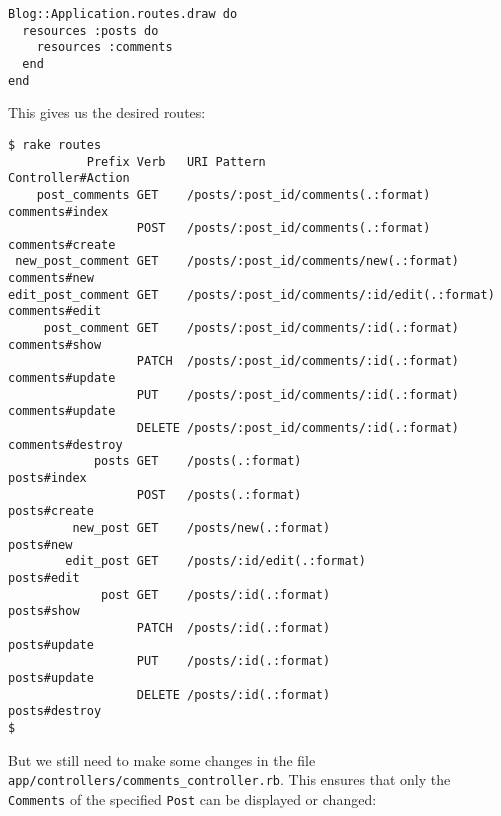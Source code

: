 \documentclass[a4paper]{book}
\begin{document}
\begin{shaded}\begin{verbatim}
Blog::Application.routes.draw do
  resources :posts do
    resources :comments
  end
end
\end{verbatim}\end{shaded}

This gives us the desired routes:

\begin{shaded}\begin{verbatim}
$ rake routes
           Prefix Verb   URI Pattern                                 Controller#Action
    post_comments GET    /posts/:post_id/comments(.:format)          comments#index
                  POST   /posts/:post_id/comments(.:format)          comments#create
 new_post_comment GET    /posts/:post_id/comments/new(.:format)      comments#new
edit_post_comment GET    /posts/:post_id/comments/:id/edit(.:format) comments#edit
     post_comment GET    /posts/:post_id/comments/:id(.:format)      comments#show
                  PATCH  /posts/:post_id/comments/:id(.:format)      comments#update
                  PUT    /posts/:post_id/comments/:id(.:format)      comments#update
                  DELETE /posts/:post_id/comments/:id(.:format)      comments#destroy
            posts GET    /posts(.:format)                            posts#index
                  POST   /posts(.:format)                            posts#create
         new_post GET    /posts/new(.:format)                        posts#new
        edit_post GET    /posts/:id/edit(.:format)                   posts#edit
             post GET    /posts/:id(.:format)                        posts#show
                  PATCH  /posts/:id(.:format)                        posts#update
                  PUT    /posts/:id(.:format)                        posts#update
                  DELETE /posts/:id(.:format)                        posts#destroy
$
\end{verbatim}\end{shaded}

But we still need to make some changes in the file \texttt{app/controllers/comments\_controller.rb}. This ensures that only the \texttt{Comments} of the specified \texttt{Post} can be displayed or changed:
\end{document}
